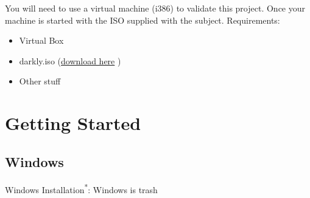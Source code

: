You will need to use a virtual machine (i386) to validate this project. Once your
machine is started with the ISO supplied with the subject.
Requirements:
\begin{itemize}
    \item Virtual Box
    \item darkly.iso (\href{https://drive.google.com/file/d/145dbZHjZWyMiRscj-72jE3n5PM5vXyB9/view?usp=sharing}{download here} )
    \item Other stuff
\end{itemize}

\section{Getting Started}

\subsection{Windows}
Windows Installation\textsuperscript{*}: Windows is trash\cite{Docker:Windows_Install}


\let\thefootnote\relax{}
\let\thefootnote\relax{}
